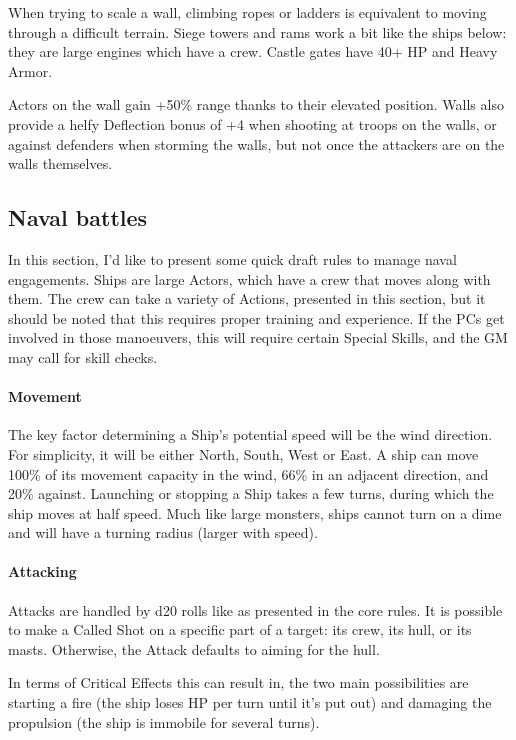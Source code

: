 When trying to scale a wall, climbing ropes or ladders is equivalent to moving through a difficult terrain. Siege towers and rams work a bit like the ships below: they are large engines which have a crew. Castle gates have 40+ HP and Heavy Armor.

Actors on the wall gain +50\% range thanks to their elevated position. Walls also provide a helfy Deflection bonus of +4 when shooting at troops on the walls, or against defenders when storming the walls, but not once the attackers are on the walls themselves.


\subsection{Naval battles}

In this section, I'd like to present some quick draft rules to manage naval engagements. Ships are large Actors, which have a crew that moves along with them. The crew can take a variety of Actions, presented in this section, but it should be noted that this requires proper training and experience. If the PCs get involved in those manoeuvers, this will require certain Special Skills, and the GM may call for skill checks.

\paragraph{Movement}

The key factor determining a Ship's potential speed will be the wind direction. For simplicity, it will be either North, South, West or East. A ship can move 100\% of its movement capacity in the wind, 66\% in an adjacent direction, and 20\% against. Launching or stopping a Ship takes a few turns, during which the ship moves at half speed. Much like large monsters, ships cannot turn on a dime and will have a turning radius (larger with speed).

\paragraph{Attacking}

Attacks are handled by d20 rolls like as presented in the core rules. It is possible to make a Called Shot on a specific part of a target: its crew, its hull, or its masts. Otherwise, the Attack defaults to aiming for the hull.

In terms of Critical Effects this can result in, the two main possibilities are starting a fire (the ship loses HP per turn until it's put out) and damaging the propulsion (the ship is immobile for several turns). 

